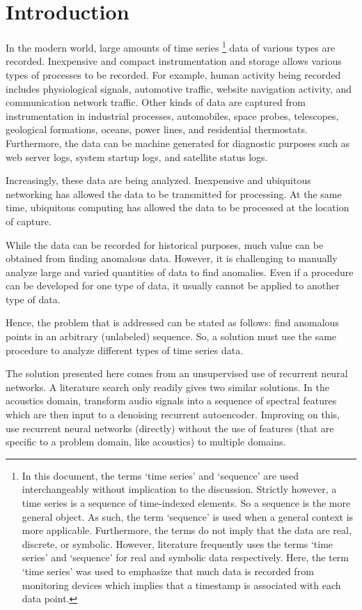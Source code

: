 \chapter{Introduction}
\label{ch:intro}

In the modern world, large amounts of time series%
\footnote{
In this document, the terms `time series' and `sequence' are used interchangeably without implication to the discussion.
%
Strictly however, a time series is a sequence of time-indexed elements.
%
So a sequence is the more general object.
%
As such, the term `sequence' is used when a general context is more applicable.
%
Furthermore, the terms do not imply that the data are real, discrete, or symbolic.
%
However, literature frequently uses the terms `time series' and `sequence' for real and symbolic data respectively.
%
Here, the term `time series' was used to emphasize that much data is recorded from monitoring devices which implies that a timestamp is associated with each data point.}
data of various types are recorded.  Inexpensive and compact instrumentation and storage allows various types of processes to be recorded. For example, human activity being recorded includes physiological signals, automotive traffic, website navigation activity, and communication network traffic. Other kinds of data are captured from instrumentation in industrial processes, automobiles, space probes, telescopes, geological formations, oceans, power lines, and residential thermostats. Furthermore, the data can be machine generated for diagnostic purposes such as web server logs, system startup logs, and satellite status logs.

Increasingly, these data are being analyzed. Inexpensive and ubiquitous networking has allowed the data to be transmitted for processing. At the same time, ubiquitous computing has allowed the data to be processed at the location of capture.

While the data can be recorded for historical purposes, much value can be obtained from finding anomalous data. However, it is challenging to manually analyze large and varied quantities of data to find anomalies. Even if a procedure can be developed for one type of data, it usually cannot be applied to another type of data.

Hence, the problem that is addressed can be stated as follows: find anomalous points in an arbitrary (unlabeled) sequence. So, a solution must use the same procedure to analyze different types of time series data.

The solution presented here comes from an unsupervised use of recurrent neural networks. A literature search only readily gives two similar solutions. In the acoustics domain, \cite{Marchi2015} transform audio signals into a sequence of spectral features which are then input to a denoising recurrent autoencoder. Improving on this, \cite{Malhotra2015} use recurrent neural networks (directly) without the use of features (that are specific to a problem domain, like acoustics) to multiple domains.

